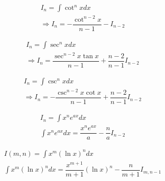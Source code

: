 \begin{align}
	I_n=\int \cot^n x dx\nonumber\\
	\Rightarrow I_n=-\dfrac{\cot^{n-2} x}{n-1}-I_{n-2}
\end{align}

\begin{align}
	I_n=\int \sec^n x dx\nonumber\\
	\Rightarrow I_n=\dfrac{\sec^{n-2}x\tan x}{n-1}+\dfrac{n-2}{n-1}I_{n-2}
\end{align}

\begin{align}
	I_n=\int \csc^n x dx\nonumber\\
	\Rightarrow I_n=-\dfrac{\csc^{n-2}x\cot x}{n-1}+\dfrac{n-2}{n-1}I_{n-2}
\end{align}

\begin{align}
	I_n=\int x^n e^{ax} dx\\
	\int x^n e^{ax} dx=\dfrac{x^n e^{ax}}{a}-\dfrac{n}{a}I_{n-2}
\end{align}

\begin{align}
	I(m,n)=\int x^m (\ln x)^n dx\\
	\int x^m (\ln x)^n dx=\dfrac{x^{m+1}}{m+1}(\ln x)^n-\dfrac{n}{m+1}I_{m,n-1}
\end{align}